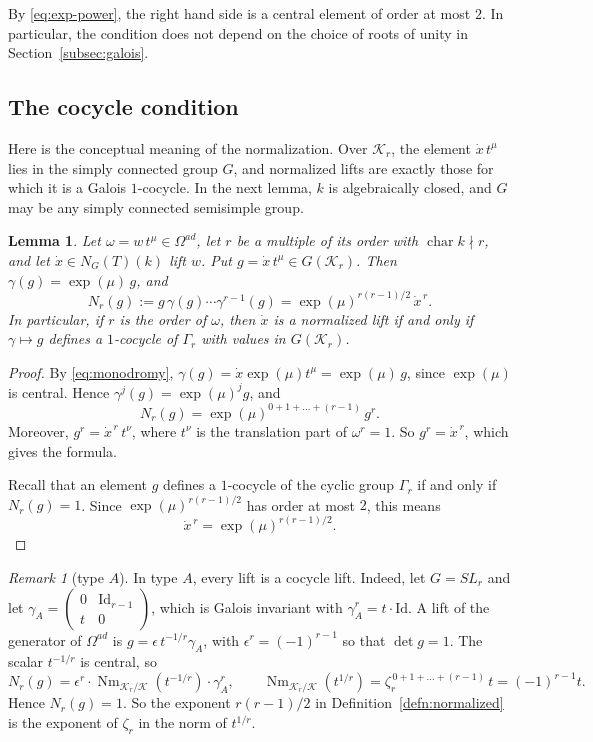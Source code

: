 \documentclass[psamsfonts]{amsart}
\newtheorem{lem}[thm]{Lemma}
\theoremstyle{definition}
\theoremstyle{remark}
\newtheorem{rem}[thm]{Remark}
\numberwithin{equation}{section}
\newcommand{\on}{\operatorname}
\DeclareMathOperator{\chara}{char}
\newcommand\cK{\mathcal{K}}
\numberwithin{equation}{section}
\renewcommand{\t}{\tau}
\newcommand{\om}{\omega}
\newcommand{\Om}{\Omega}
\newcommand\Nm{\on{Nm}}
\newcommand{\Id}{\mathrm{Id}}
\theoremstyle{plain}
\begin{document}
By \eqref{eq:exp-power}, the right hand side is a central element of order at most $2$. In particular, the condition does not depend on the choice of roots of unity in Section~\ref{subsec:galois}.

\subsection{The cocycle condition}
Here is the conceptual meaning of the normalization. Over $\cK_r$, the element $\dot x\,t^\mu$ lies in the simply connected group $G$, and normalized lifts are exactly those for which it is a Galois $1$-cocycle. In the next lemma, $k$ is algebraically closed, and $G$ may be any simply connected semisimple group.

\begin{lem}\label{lem:cocycle}
Let $\om=w\,t^\mu\in\Om^{ad}$, let $r$ be a multiple of its order with $\chara k\nmid r$, and let $\dot x\in N_G(T)(k)$ lift $w$. Put $g=\dot x\,t^\mu\in G(\cK_r)$. Then $\gamma(g)=\exp(\mu)\,g$, and
\[
N_r(g):=g\,\gamma(g)\cdots\gamma^{r-1}(g)=\exp(\mu)^{r(r-1)/2}\,\dot x^{\,r}.
\]
In particular, if $r$ is the order of $\om$, then $\dot x$ is a normalized lift if and only if $\gamma\mapsto g$ defines a $1$-cocycle of $\Gamma_r$ with values in $G(\cK_r)$.
\end{lem}

\begin{proof}
By \eqref{eq:monodromy}, $\gamma(g)=\dot x\exp(\mu)t^\mu=\exp(\mu)\,g$, since $\exp(\mu)$ is central. Hence $\gamma^j(g)=\exp(\mu)^jg$, and
\[
N_r(g)=\exp(\mu)^{0+1+\dots+(r-1)}\,g^r.
\]
Moreover, $g^r=\dot x^{\,r}\,t^{\nu}$, where $t^\nu$ is the translation part of $\om^r=1$. So $g^r=\dot x^{\,r}$, which gives the formula.

Recall that an element $g$ defines a $1$-cocycle of the cyclic group $\Gamma_r$ if and only if $N_r(g)=1$. Since $\exp(\mu)^{r(r-1)/2}$ has order at most $2$, this means
\[
\dot x^{\,r}=\exp(\mu)^{r(r-1)/2}.
\]
\end{proof}

\begin{rem}[type $A$]\label{rem:typeA}
In type $A$, every lift is a cocycle lift. Indeed, let $G=SL_r$ and let $\gamma_A=\left(\begin{smallmatrix}0&\Id_{r-1}\\t&0\end{smallmatrix}\right)$, which is Galois invariant with $\gamma_A^r=t\cdot\Id$. A lift of the generator of $\Om^{ad}$ is $g=\epsilon\,t^{-1/r}\gamma_A$, with $\epsilon^r=(-1)^{r-1}$ so that $\det g=1$. The scalar $t^{-1/r}$ is central, so
\[
N_r(g)=\epsilon^r\cdot\Nm_{\cK_r/\cK}(t^{-1/r})\cdot\gamma_A^r,\qquad \Nm_{\cK_r/\cK}(t^{1/r})=\zeta_r^{\,0+1+\dots+(r-1)}\,t=(-1)^{r-1}t.
\]
Hence $N_r(g)=1$. So the exponent $r(r-1)/2$ in Definition~\ref{defn:normalized} is the exponent of $\zeta_r$ in the norm of $t^{1/r}$.
\end{rem}
\end{document}
